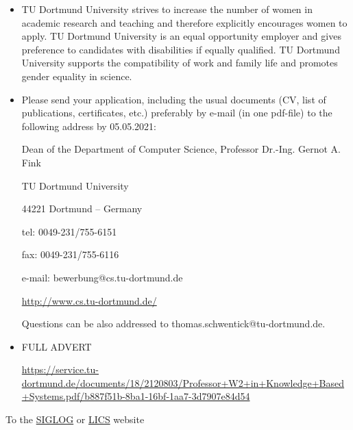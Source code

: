 \documentclass[prodmode,acmtecs]{acmsmall} %
\begin{document}
\begin{itemize}
\item  TU Dortmund University strives to increase the number of women in academic research and teaching and therefore explicitly encourages women to apply. TU Dortmund University is an equal opportunity employer and gives preference to candidates with disabilities if equally qualified. TU Dortmund University supports the compatibility of work and family life and promotes gender equality in science. 
 
\item  Please send your application, including the usual documents (CV, list of publications, certificates, etc.) preferably by e-mail (in one pdf-file) to the following address by 05.05.2021: 
 
  Dean of the Department of Computer Science, Professor Dr.-Ing. Gernot A. Fink 
 
  TU Dortmund University 
 
  44221 Dortmund – Germany 
 
  tel: 0049-231/755-6151 
 
  fax: 0049-231/755-6116 
 
  e-mail: bewerbung@cs.tu-dortmund.de 
 
  \href{http://www.cs.tu-dortmund.de/}{http://www.cs.tu-dortmund.de/} 
 
  Questions can be also addressed to thomas.schwentick@tu-dortmund.de. 
 
\item  FULL ADVERT 
 
  \href{https://service.tu-dortmund.de/documents/18/2120803/Professor+W2+in+Knowledge+Based+Systems.pdf/b887f51b-8ba1-16bf-1aa7-3d7907e84d54}{https://service.tu-dortmund.de/documents/18/2120803/Professor+W2+in+Knowledge+Based+Systems.pdf/b887f51b-8ba1-16bf-1aa7-3d7907e84d54} 
 
\end{itemize}


To the \href{http://siglog.org/}{SIGLOG} or \href{https://lics.siglog.org}{LICS} website
\end{document}
